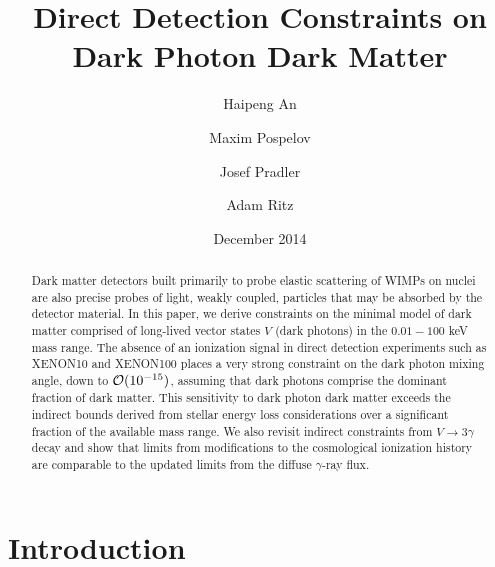 \documentclass[prd,reprint,nofootinbib,notitlepage,aps,tightenlines,preprintnumbers,amsmath,amssymb,showpacs,superscriptaddress]{revtex4-1}
\begin{document}

\title{Direct Detection Constraints on Dark Photon Dark Matter}

\author{Haipeng An}

\author{Maxim Pospelov}

\author{Josef Pradler}

\author{Adam Ritz}

\date{December 2014}

\begin{abstract}
Dark matter detectors built primarily to probe elastic scattering of WIMPs on nuclei are also precise probes of light, weakly coupled, particles that may be absorbed by the detector material.  In this paper, we derive constraints on the minimal model of dark matter comprised of long-lived vector states $V$ (dark photons) in the $0.01-100$ keV mass range.  The absence of an ionization signal in direct detection experiments such as XENON10 and XENON100 places a very strong constraint on the dark photon mixing angle, down to ${\cal O}(10^{-15})$, assuming that dark photons comprise the dominant fraction of dark matter. This sensitivity to dark photon dark matter exceeds the indirect bounds derived from stellar energy loss considerations over a significant fraction of the available mass range. We also revisit indirect constraints from $V\to 3\gamma$ decay and show that limits from modifications to the cosmological ionization history are comparable to the updated limits from the diffuse $\gamma$-ray flux.
\end{abstract}
\maketitle



\section{Introduction}
\end{document}
